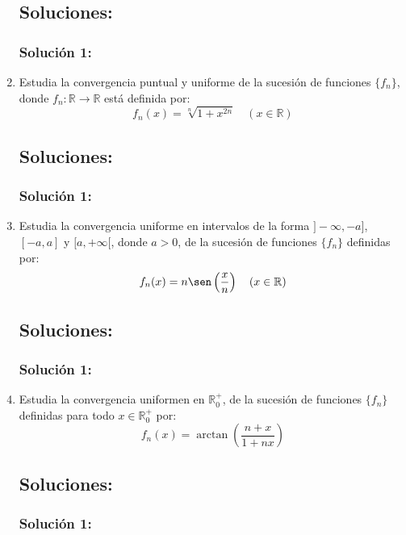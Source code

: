 \documentclass[a4paper, 11pt]{article} %
\begin{document}
\begin{enumerate}
	\subsection*{Soluciones:}
		\subsubsection*{Solución 1:}
	
	\item Estudia la convergencia puntual y uniforme de la sucesión de funciones $\{f_n\}$, donde
	$f_n: \mathbb{R} \rightarrow \mathbb{R}$ está definida por:
	$$f_n(x) = \sqrt[n]{1+x^{2n}} \quad (x \in \mathbb{R})$$
	\subsection*{Soluciones:}
		\subsubsection*{Solución 1:}
	
	\item Estudia la convergencia uniforme en intervalos de la forma $]-\infty, -a]$, $[-a,a]$ y
	$[a, +\infty[$, donde $a > 0$, de la sucesión de funciones $\{f_n\}$ definidas por:
	$$f_n(x) = n \sen\left(\frac{x}{n}\right) \quad (x \in \mathbb{R})$$
	\subsection*{Soluciones:}
		\subsubsection*{Solución 1:}
	
	\item Estudia la convergencia uniformen en $\mathbb{R}^+_0$, de la sucesión de funciones $\{f_n\}$
	definidas para todo $x \in \mathbb{R}^+_0$ por:
	$$f_n(x) = \arctan\left(\frac{n+x}{1+nx}\right)$$
	\subsection*{Soluciones:}
		\subsubsection*{Solución 1:}
\end{enumerate}
\end{document}
